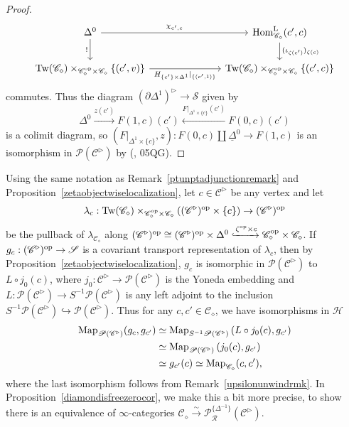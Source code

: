 \documentclass{tac}
\newcommand{\s}[1]{\mathscr{#1}}
\newcommand{\tx}[1]{\textnormal{#1}}
\newcommand{\ul}[1]{\underline{#1}}
\begin{document}
\begin{proof}
\[\begin{tikzcd}
\Delta^0\arrow[]{rrr}{\chi_{c' ,c}} \arrow[]{d}[swap]{!} & & & \tx{Hom}^\tx{L}_{\s{C}_\diamond} (c',c) \arrow[]{d}{( \iota_{\zeta (c')} )_{\zeta (c)}} \\
\tx{Tw}(\s{C}_\diamond ) \times_{\s{C}_\diamond^\tx{op} \times \s{C}_\diamond } \{ (c' , v) \} \arrow[]{rrr}[swap]{H_{\{c' \} \times \Delta^1  } |_{\{ (c' , 1) \} }} & & & \tx{Tw}(\s{C}_\diamond ) \times_{\s{C}_\diamond^\tx{op} \times \s{C}_\diamond } \{ (c' , c) \}
\end{tikzcd}\]
commutes.  Thus the diagram $(\partial \Delta^1 )^\triangleright \to \s{S}$ given by
\[ \Delta^0 \xrightarrow{z(c')} F(1,c)(c') \xleftarrow{F|_{\Delta^1 \times \{ c\}} (c')} F(0,c)(c')\]
is a colimit diagram, so $(F|_{\Delta^1 \times \{c\}} , z) : F(0,c) \coprod \ul{\Delta}^0 \to F(1,c)$ is an isomorphism in $\s{P}(\s{C}^\triangleright )$ by (\cite{kerodon}, 05QG).
\end{proof}
\begin{rmk} Using the same notation as Remark~\ref{ptunptadjunctionremark} and Proposition~\ref{zetaobjectwiselocalization}, let $c \in \s{C}^\triangleright $ be any vertex and let 
\[\lambda_c : \tx{Tw}(\s{C}_\diamond ) \times_{\s{C}_\diamond^\tx{op} \times \s{C}_\diamond} \left( (\s{C}^\triangleright )^\tx{op} \times \{ c\} \right) \to (\s{C}^\triangleright )^\tx{op} \]
be the pullback of $\lambda_{\s{C}_\diamond}$ along $(\s{C}^\triangleright )^\tx{op} \cong (\s{C}^\triangleright )^\tx{op} \times \Delta^0 \xhookrightarrow{\zeta^\tx{op} \times c} \s{C}_\diamond^\tx{op} \times \s{C}_\diamond$.  If $g_c :  (\s{C}^\triangleright )^\tx{op} \to \s{S}$ is a covariant transport representation of $\lambda_c$, then by Proposition~\ref{zetaobjectwiselocalization}, $g_c$ is isomorphic in $\s{P}(\s{C}^\triangleright )$ to $L\circ j_0 (c)$, where $j_0 : \s{C}^\triangleright \to \s{P}(\s{C}^\triangleright)$ is the Yoneda embedding and $L : \s{P}(\s{C}^\triangleright ) \to S^{-1} \s{P}(\s{C}^\triangleright )$ is any left adjoint to the inclusion $ S^{-1} \s{P}(\s{C}^\triangleright ) \hookrightarrow   \s{P}(\s{C}^\triangleright )$.  Thus for any $c , c' \in \s{C}_\diamond $, we have isomorphisms in $\s{H}$
\begin{align*} \tx{Map}_{\s{P}(\s{C}^\triangleright ) } (g_c , g_{c'}) & \simeq  \tx{Map}_{S^{-1} \s{P}(\s{C}^\triangleright ) } \left( L\circ j_0 (c), g_{c'} \right) \\
& \simeq \tx{Map}_{\s{P}(\s{C}^\triangleright ) } \left( j_0 (c), g_{c'}\right) \\
& \simeq g_{c'} (c) \simeq \tx{Map}_{\s{C}_\diamond }(c,c'), \end{align*}
where the last isomorphism follows from Remark~\ref{upsilonunwindrmk}.  In Proposition~\ref{diamondisfreezerocor}, we make this a bit more precise, to show there is an equivalence of $\infty$-categories $\s{C}_\diamond \xrightarrow{\sim} \s{P}^{\{ \Delta^{-1} \}}_{\s{R}}(\s{C}^\triangleright)$.
\end{rmk}
\end{document}
